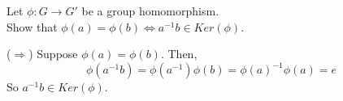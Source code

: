 \begin{exercise}
    Let $\phi : G \to G'$ be a group homomorphism.\\
    Show that $\phi(a) = \phi(b) \iff a^{-1}b \in Ker(\phi)$.
\end{exercise}
\begin{answer}
    ($\Rightarrow$) Suppose $\phi(a) = \phi(b)$. Then,
    \[\phi(a^{-1}b) = \phi(a^{-1})\phi(b) = \phi(a)^{-1}\phi(a) =  e\]
    So $a^{-1}b \in Ker(\phi)$.\\
\end{answer}